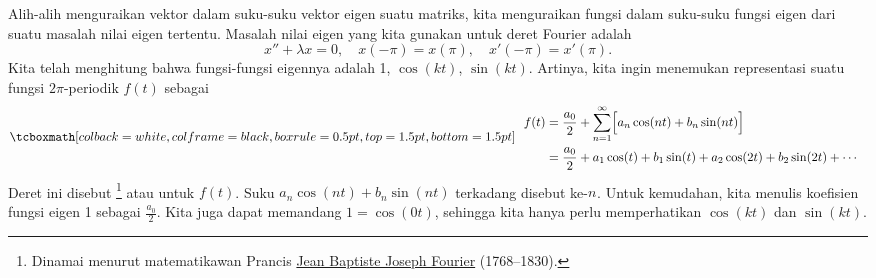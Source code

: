 Alih-alih menguraikan vektor dalam suku-suku vektor eigen suatu matriks,
kita menguraikan fungsi dalam suku-suku fungsi eigen dari suatu
masalah nilai eigen tertentu.  Masalah nilai eigen yang kita gunakan untuk
deret Fourier adalah
\begin{equation*}
x'' + \lambda x = 0, \quad x(-\pi) = x(\pi), \quad x'(-\pi) = x'(\pi) .
\end{equation*}
Kita telah menghitung bahwa fungsi-fungsi eigennya adalah 1, $\cos (k t)$,
$\sin (k t)$.  Artinya, kita ingin menemukan representasi suatu
fungsi $2\pi$-periodik $f(t)$ sebagai
\begin{equation*}
\mybxbg{~~
\begin{aligned}
f(t) &=
\frac{a_0}{2} +
\sum_{n=1}^\infty
\Bigl[ a_n \cos (n t) + b_n \sin (n t) \Bigr]
\\
& = 
\frac{a_0}{2}
+ a_1 \cos (t) + b_1 \sin (t) 
+ a_2 \cos (2 t) + b_2 \sin (2 t) 
+ \cdots
\end{aligned}
~~}
\end{equation*}
Deret ini disebut \emph{}%
\footnote{Dinamai menurut matematikawan Prancis
\href{https://en.wikipedia.org/wiki/Joseph_Fourier}{Jean Baptiste Joseph Fourier}
(1768--1830).} atau
\emph{} untuk $f(t)$.
Suku
$a_n \cos (n t) + b_n \sin (n t)$ terkadang disebut
\emph{} ke-$n^{\text{}}$.
Untuk kemudahan, kita menulis koefisien fungsi eigen 1 sebagai $\frac{a_0}{2}$.
Kita juga dapat memandang $1 = \cos (0t)$, sehingga
kita hanya perlu memperhatikan $\cos (kt)$ dan $\sin (kt)$.

